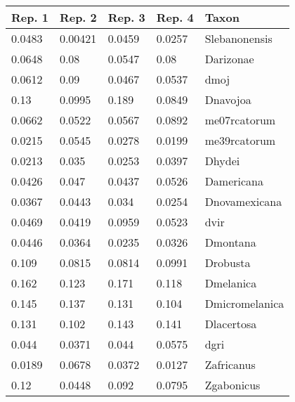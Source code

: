 \begin{tabular}{lllll}
\toprule
         Rep. 1 &          Rep. 2 &          Rep. 3 &        Rep. 4 &                   Taxon \\
\midrule
         0.0483 &         0.00421 &          0.0459 &        0.0257 &           Slebanonensis \\
         0.0648 &            0.08 &          0.0547 &          0.08 &               Darizonae \\
         0.0612 &            0.09 &          0.0467 &        0.0537 &                    dmoj \\
           0.13 &          0.0995 &           0.189 &        0.0849 &                Dnavojoa \\
         0.0662 &          0.0522 &          0.0567 &        0.0892 &            me07rcatorum \\
         0.0215 &          0.0545 &          0.0278 &        0.0199 &            me39rcatorum \\
         0.0213 &           0.035 &          0.0253 &        0.0397 &                  Dhydei \\
         0.0426 &           0.047 &          0.0437 &        0.0526 &              Damericana \\
         0.0367 &          0.0443 &           0.034 &        0.0254 &           Dnovamexicana \\
         0.0469 &          0.0419 &          0.0959 &        0.0523 &                    dvir \\
         0.0446 &          0.0364 &          0.0235 &        0.0326 &                Dmontana \\
          0.109 &          0.0815 &          0.0814 &        0.0991 &                Drobusta \\
          0.162 &           0.123 &           0.171 &         0.118 &               Dmelanica \\
          0.145 &           0.137 &           0.131 &         0.104 &          Dmicromelanica \\
          0.131 &           0.102 &           0.143 &         0.141 &              Dlacertosa \\
          0.044 &          0.0371 &           0.044 &        0.0575 &                    dgri \\
         0.0189 &          0.0678 &          0.0372 &        0.0127 &              Zafricanus \\
           0.12 &          0.0448 &           0.092 &        0.0795 &              Zgabonicus \\

\end{tabular}
